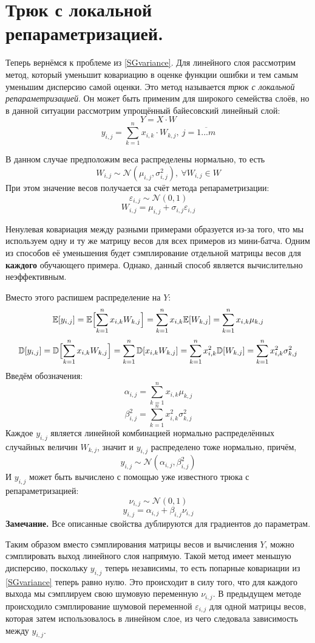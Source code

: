\section{Трюк с локальной репараметризацией.}

Теперь вернёмся к проблеме из \ref{SGvariance}. Для линейного слоя рассмотрим метод, который уменьшит ковариацию в оценке функции ошибки и тем самым уменьшим
 дисперсию самой оценки. Это метод\cite{localRT} называется \textit{трюк с локальной репараметризацией}. Он может быть применим для широкого семейства слоёв,
 но в данной ситуации рассмотрим упрощённый байесовский линейный слой:
$$Y = X \cdot W$$
$$y_{i,j} = \sum_{k=1}^n x_{i,k} \cdot W_{k,j},\ j=\overline{1...m}$$

В данном случае предположим веса распределены нормально, то есть
$$W_{i,j} \sim \mathcal{N}(\mu_{i,j}, \sigma_{i,j}^2),\ \forall W_{i,j} \in W$$
При этом значение весов получается за счёт метода репараметризации:
$$\varepsilon_{i,j} \sim \mathcal{N}(0,1)$$
$$W_{i,j} = \mu_{i,j} + \sigma_{i,j}\varepsilon_{i,j}$$

Ненулевая ковариация между разными примерами образуется из-за того, что мы используем одну и ту же матрицу весов для всех примеров из мини-батча.
 Одним из способов её уменьшения будет сэмплирование отдельной матрицы весов для \textbf{каждого} обучающего примера. Однако, данный способ является
 вычислительно неэффективным.

Вместо этого распишем распределение на $Y$:
$$\mathbb{E}[y_{i,j}] = \mathbb{E}\Bigl[\sum_{k=1}^n x_{i,k}W_{k,j}\Bigr]=\sum_{k=1}^n x_{i,k} \mathbb{E}[W_{k,j}]=\sum_{k=1}^n x_{i,k}\mu_{k,j}$$
$$\mathbb{D}[y_{i,j}] = \mathbb{D}\Bigl[\sum_{k=1}^n x_{i,k}W_{k,j}\Bigr]=\sum_{k=1}^n \mathbb{D}[x_{i,k}W_{k,j}]=\sum_{k=1}^n x_{i,k}^2 \mathbb{D}[W_{k,j}]=\sum_{k=1}^n x_{i,k}^2\sigma_{k,j}^2$$
Введём обозначения:
$$\alpha_{i,j} = \sum_{k=1}^n x_{i,k}\mu_{k,j}$$
$$\beta_{i,j}^2 = \sum_{k=1}^n x_{i,k}^2\sigma_{k,j}^2$$
Каждое $y_{i,j}$ является линейной комбинацией нормально распределённых случайных величин $W_{k, j}$, значит и $y_{i,j}$ распределено тоже нормально, причём,
$$y_{i,j} \sim \mathcal{N}(\alpha_{i,j}, \beta_{i,j}^2)$$
И $y_{i,j}$ может быть вычислено с помощью уже известного трюка с репараметризацией:
$$\nu_{i,j} \sim \mathcal{N}(0,1)$$
$$y_{i,j}=\alpha_{i,j} + \beta_{i,j}\nu_{i,j}$$
\textbf{Замечание.} Все описанные свойства дублируются для градиентов до параметрам.

Таким образом вместо сэмплирования матрицы весов и вычисления $Y$, можно сэмплировать выход линейного слоя напрямую.
 Такой метод имеет меньшую дисперсию, поскольку $y_{i,j}$ теперь независимы, то есть попарные ковариации из \ref{SGvariance} теперь равно нулю. Это происходит в
 силу того, что для каждого выхода мы сэмплируем свою шумовую переменную $\nu_{i,j}$. В предыдущем методе происходило сэмплирование шумовой переменной $\varepsilon_{i,j}$ для одной матрицы весов,
 которая затем использовалось в линейном слое, из чего следовала зависимость между $y_{i,j}$.

